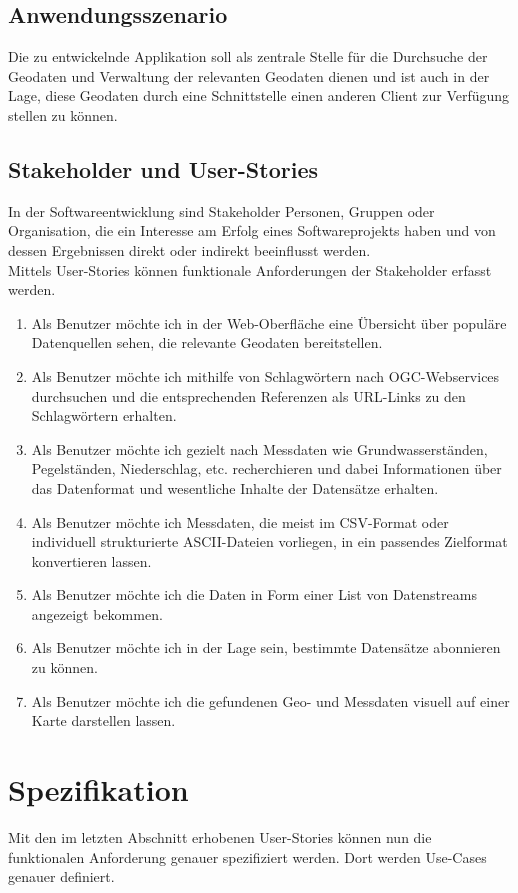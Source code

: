\documentclass[a4paper,12pt]{scrreprt}
\begin{document}
	\subsection{Anwendungsszenario}
	Die zu entwickelnde Applikation soll als zentrale Stelle für die Durchsuche der Geodaten und Verwaltung der relevanten Geodaten dienen und ist auch in der Lage, diese Geodaten durch eine Schnittstelle einen anderen Client zur Verfügung stellen zu können.
	\subsection{Stakeholder und User-Stories}
	In der Softwareentwicklung sind Stakeholder Personen, Gruppen oder Organisation, die ein Interesse am Erfolg eines Softwareprojekts haben und von dessen Ergebnissen direkt oder indirekt beeinflusst werden.\\
	Mittels User-Stories können funktionale Anforderungen der Stakeholder erfasst werden.
	\begin{enumerate}
		\item Als Benutzer möchte ich in der Web-Oberfläche eine Übersicht über populäre Datenquellen sehen, die  relevante Geodaten bereitstellen.
		\item Als Benutzer möchte ich mithilfe von Schlagwörtern nach OGC-Webservices durchsuchen und die entsprechenden Referenzen als URL-Links zu den Schlagwörtern erhalten.
		\item Als Benutzer möchte ich gezielt nach Messdaten wie Grundwasserständen, Pegelständen, Niederschlag, etc. recherchieren und dabei Informationen über das Datenformat und wesentliche Inhalte der Datensätze erhalten.
		\item Als Benutzer möchte ich Messdaten, die meist im CSV-Format oder individuell strukturierte ASCII-Dateien vorliegen, in ein passendes Zielformat konvertieren lassen.
		\item Als Benutzer möchte ich die Daten in Form einer List von Datenstreams angezeigt bekommen.
		\item Als Benutzer möchte ich in der Lage sein, bestimmte Datensätze abonnieren zu können.
		\item Als Benutzer möchte ich die gefundenen Geo- und Messdaten visuell auf einer Karte darstellen lassen.
	\end{enumerate}
	
	\section{Spezifikation}
	Mit den im letzten Abschnitt erhobenen User-Stories können nun die funktionalen Anforderung genauer spezifiziert werden. Dort werden Use-Cases genauer definiert.
\end{document}
